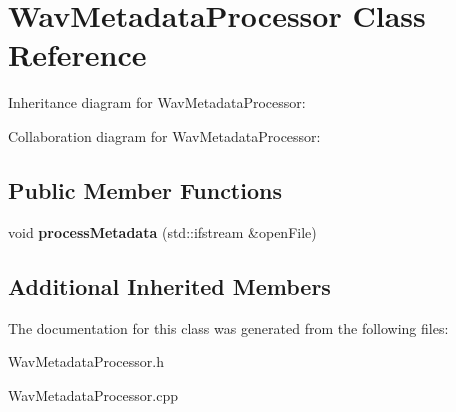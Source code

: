\hypertarget{classWavMetadataProcessor}{}\section{Wav\+Metadata\+Processor Class Reference}
\label{classWavMetadataProcessor}


Inheritance diagram for Wav\+Metadata\+Processor\+:


Collaboration diagram for Wav\+Metadata\+Processor\+:
\subsection*{Public Member Functions}
\begin{DoxyCompactItemize}
\item 
\mbox{\label{classWavMetadataProcessor_abd047bd72aa9179e6f42da05fb4b9b85}} 
void {\bfseries process\+Metadata} (std\+::ifstream \&open\+File)
\end{DoxyCompactItemize}
\subsection*{Additional Inherited Members}


The documentation for this class was generated from the following files\+:\begin{DoxyCompactItemize}
\item 
Wav\+Metadata\+Processor.\+h\item 
Wav\+Metadata\+Processor.\+cpp\end{DoxyCompactItemize}
